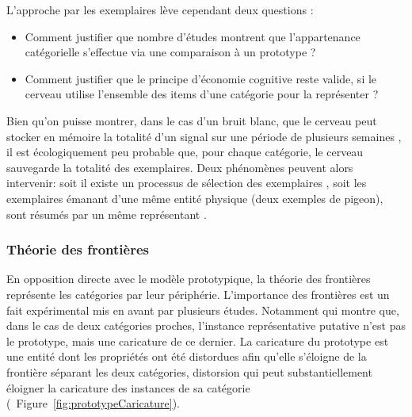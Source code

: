 L'approche par les exemplaires lève cependant deux questions \citep{goldstone2003concepts}:

\begin{itemize}
\item Comment justifier que nombre d'études montrent que l'appartenance catégorielle s'effectue via une comparaison à un prototype ?
\item Comment justifier que le principe d'économie cognitive reste valide, si le cerveau utilise l'ensemble des items d'une catégorie pour la représenter ? 
\end{itemize}


Bien qu'on puisse montrer, dans le cas d'un bruit blanc, que le cerveau peut stocker en mémoire la totalité d'un signal sur une période de plusieurs semaines  \citep{agus2010rapid}, il est écologiquement peu probable que, pour chaque catégorie, le cerveau sauvegarde la totalité des exemplaires. Deux phénomènes peuvent alors intervenir: soit il existe un processus de sélection des exemplaires \citep{palmeri1995recognition}, soit les exemplaires émanant d'une même entité physique (deux exemples de pigeon), sont résumés par un même représentant \citep{barsalou1998basing}.%

\subsubsection{Théorie des frontières}

En opposition directe avec le modèle prototypique, la théorie des frontières représente les catégories par leur périphérie. L'importance des frontières est un fait expérimental mis en avant par plusieurs études. Notamment \citep{davis2010memory} qui montre que, dans le cas de deux catégories proches, l'instance représentative putative n'est pas le prototype, mais une caricature de ce dernier. La caricature du prototype est une entité dont les propriétés ont été distordues afin qu'elle s'éloigne de la frontière séparant les deux catégories, distorsion qui peut substantiellement éloigner la caricature des instances de sa catégorie (\cf~Figure~\ref{fig:prototypeCaricature}).

